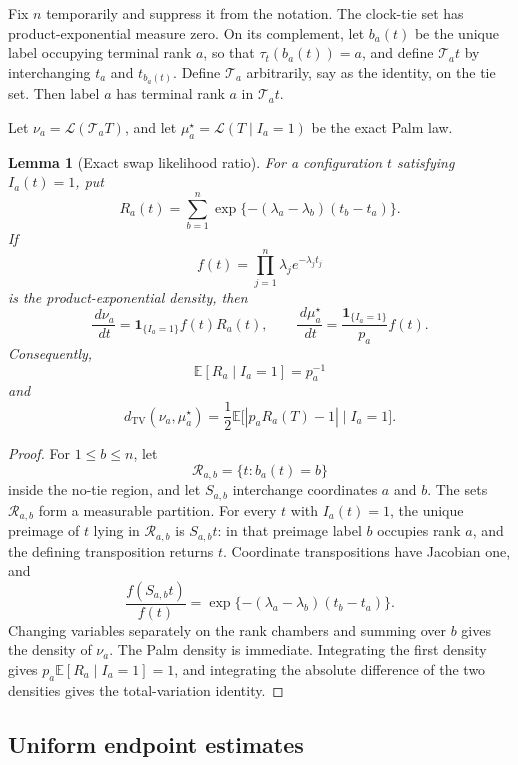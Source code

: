 \documentclass[11pt]{article}
\newtheorem{lemma}[theorem]{Lemma}
\theoremstyle{remark}
\newcommand{\Ee}{\mathbb E}
\newcommand{\one}{\mathbf 1}
\newcommand{\TV}{\mathrm{TV}}
\newcommand{\dd}{\,d}
\begin{document}
Fix $n$ temporarily and suppress it from the notation.  The clock-tie set has
product-exponential measure zero.  On its complement, let $b_a(t)$ be the
unique label occupying terminal rank $a$, so that $\tau_t(b_a(t))=a$, and
define $\mathcal T_at$ by interchanging $t_a$ and $t_{b_a(t)}$.  Define
$\mathcal T_a$ arbitrarily, say as the identity, on the tie set.  Then label
$a$ has terminal rank $a$ in $\mathcal T_at$.

Let $\nu_a=\mathcal L(\mathcal T_aT)$, and let
$\mu_a^\star=\mathcal L(T\mid I_a=1)$ be the exact Palm law.

\begin{lemma}[Exact swap likelihood ratio]\label{lem:swap-likelihood}
For a configuration $t$ satisfying $I_a(t)=1$, put
\[
        R_a(t)=\sum_{b=1}^n
        \exp\{-(\lambda_a-\lambda_b)(t_b-t_a)\}.
\]
If
\[
        f(t)=\prod_{j=1}^n\lambda_j e^{-\lambda_jt_j}
\]
is the product-exponential density, then
\[
        \frac{\dd\nu_a}{\dd t}
        =\one_{\{I_a=1\}}f(t)R_a(t),
        \qquad
        \frac{\dd\mu_a^\star}{\dd t}
        =\frac{\one_{\{I_a=1\}}}{p_a}f(t).
\]
Consequently,
\[
        \Ee[R_a\mid I_a=1]=p_a^{-1}
\]
and
\[
        d_{\TV}(\nu_a,\mu_a^\star)
        =\frac12\Ee\bigl[|p_aR_a(T)-1|\mid I_a=1\bigr].
\]
\end{lemma}

\begin{proof}
For $1\le b\le n$, let
\[
        \mathcal R_{a,b}=\{t:b_a(t)=b\}
\]
inside the no-tie region, and let $S_{a,b}$ interchange coordinates $a$ and
$b$.  The sets $\mathcal R_{a,b}$ form a measurable partition.  For every
$t$ with $I_a(t)=1$, the unique preimage of $t$ lying in
$\mathcal R_{a,b}$ is $S_{a,b}t$: in that preimage label $b$ occupies rank
$a$, and the defining transposition returns $t$.  Coordinate transpositions
have Jacobian one, and
\[
        \frac{f(S_{a,b}t)}{f(t)}
        =\exp\{-(\lambda_a-\lambda_b)(t_b-t_a)\}.
\]
Changing variables separately on the rank chambers and summing over $b$ gives
the density of $\nu_a$.  The Palm density is immediate.  Integrating the
first density gives $p_a\Ee[R_a\mid I_a=1]=1$, and integrating the absolute
difference of the two densities gives the total-variation identity.
\end{proof}

\subsection{Uniform endpoint estimates}
\end{document}
